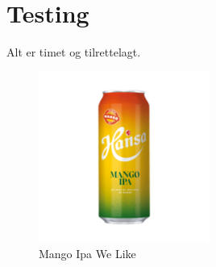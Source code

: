 \chapter{Testing}
\thispagestyle{fancy}
Alt er timet og tilrettelagt.


\begin{figure}[htbp]
    \centering
    \includegraphics[width=0.5\textwidth]{Bilder/mango.jpg}
    \caption{Mango Ipa We Like}
    \label{fig:Mango-Logo}
\end{figure}
    